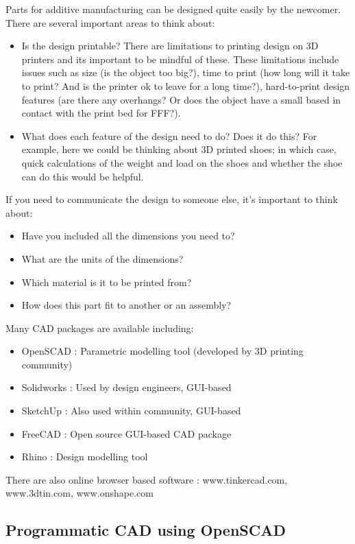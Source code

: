 Parts for additive manufacturing can be designed quite easily by the newcomer. There are several important areas to think about: 
\begin{itemize}
 \item Is the design printable? There are limitations to printing design on 3D printers and its important to be mindful of these. These limitations include issues such as size (is the object too big?), time to print (how long will it take to print? And is the printer ok to leave for a long time?), hard-to-print design features (are there any overhangs? Or does the object have a small based in contact with the print bed for FFF?).
 \item What does each feature of the design need to do? Does it do this? For example, here we could be thinking about 3D printed shoes; in which case, quick calculations of the weight and load on the shoes and whether the shoe can do this would be helpful. 
\end{itemize}

If you need to communicate the design to someone else, it's important to think about: 
\begin{itemize}
 \item Have you included all the dimensions you need to? 
 \item What are the units of the dimensions? 
 \item Which material is it to be printed from? 
 \item How does this part fit to another or an assembly? 
\end{itemize}

Many CAD packages are available including: 
\begin{itemize}
 \item OpenSCAD : Parametric modelling tool (developed by 3D printing community)
 \item Solidworks : Used by design engineers, GUI-based
 \item SketchUp :  Also used within community, GUI-based
 \item FreeCAD : Open source GUI-based CAD package 
 \item Rhino : Design modelling tool  
\end{itemize}

There are also online browser based software : www.tinkercad.com, www.3dtin.com, www.onshape.com


\subsection{Programmatic CAD using OpenSCAD}

